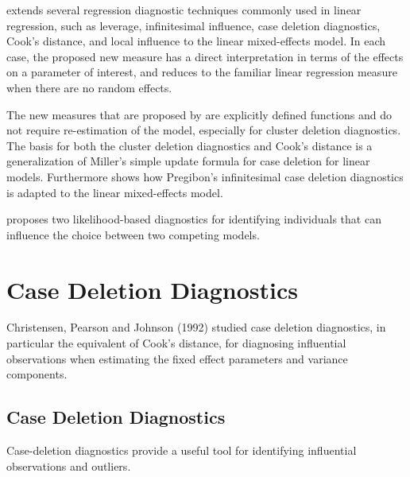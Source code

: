 \documentclass[MAIN.tex]{subfiles}
\begin{document}
\citet{Demi} extends several regression diagnostic techniques commonly used in linear regression, such as leverage, infinitesimal influence, case deletion diagnostics, Cook's distance, and local influence to the linear mixed-effects model. In each case, the proposed new measure has a direct interpretation in terms of the effects on a parameter of interest, and reduces to the familiar linear regression measure when there are no random effects. 

The new measures that are proposed by \citet{Demi} are explicitly defined functions and do not require re-estimation of the model, especially for cluster deletion diagnostics. The basis for both the cluster deletion diagnostics and Cook's distance is a generalization of Miller's simple update formula for case deletion for linear models. Furthermore \citet{Demi} shows how Pregibon's infinitesimal case deletion diagnostics is adapted to the linear mixed-effects model. 


%
%
%

\citet{Demi} proposes two likelihood-based diagnostics for identifying individuals that can influence the choice between two competing models.

	
\section{Case Deletion Diagnostics} %

Christensen, Pearson and Johnson (1992) studied  case deletion diagnostics, in particular the equivalent of Cook's distance, for diagnosing influential observations when estimating the fixed effect parameters and variance components.

\subsection{Case Deletion Diagnostics}
Case-deletion diagnostics provide a useful tool for identifying influential observations and outliers.
\end{document}
